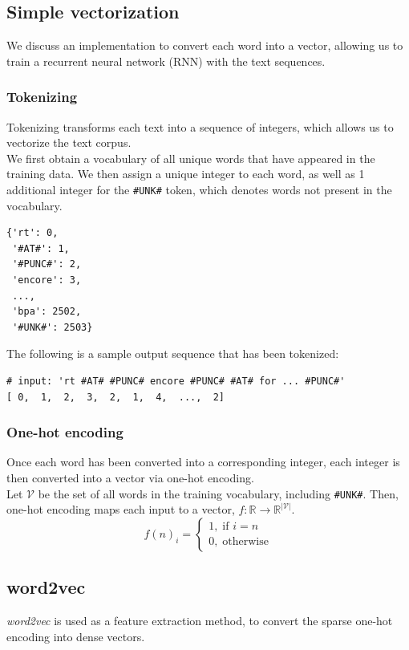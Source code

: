 \documentclass{article}
\numberwithin{equation}{section}
\begin{document}
\subsection{Simple vectorization}
We discuss an implementation to convert each word into a vector, allowing us to train a recurrent neural network (RNN) with the text sequences.

\subsubsection{Tokenizing}
Tokenizing transforms each text into a sequence of integers, which allows us to vectorize the text corpus.\\

We first obtain a vocabulary of all unique words that have appeared in the training data.  We then assign a unique integer to each word, as well as 1 additional integer for the \lstinline{#UNK#} token, which denotes words not present in the vocabulary.

\begin{verbatim}
{'rt': 0,
 '#AT#': 1,
 '#PUNC#': 2,
 'encore': 3,
 ...,
 'bpa': 2502,
 '#UNK#': 2503}
\end{verbatim}

The following is a sample output sequence that has been tokenized:
\begin{verbatim}
# input: 'rt #AT# #PUNC# encore #PUNC# #AT# for ... #PUNC#'
[ 0,  1,  2,  3,  2,  1,  4,  ...,  2]
\end{verbatim}

\subsubsection{One-hot encoding}
Once each word has been converted into a corresponding integer, each integer is then converted into a vector via one-hot encoding.\\

Let $\mathcal{V}$ be the set of all words in the training vocabulary, including \lstinline{#UNK#}. Then, one-hot encoding maps each input to a vector, $f: \mathbb{R} \rightarrow \mathbb{R}^{|\mathcal{V}|}$.
	$$ f(n)_i = \left\{\begin{matrix}
	1, \; \text{if } i=n\\ 
	0, \; \text{otherwise}
	\end{matrix}\right. $$

\subsection{word2vec}
\emph{word2vec} is used as a feature extraction method, to convert the sparse one-hot encoding into dense vectors.
\end{document}
